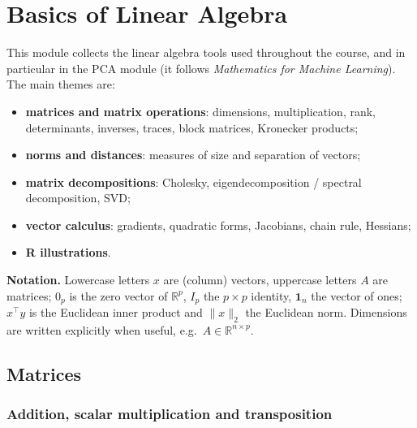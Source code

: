 
\chapter{Basics of Linear Algebra}

This module collects the linear algebra tools used throughout the course, and in particular in the
PCA module (it follows \emph{Mathematics for Machine Learning}). The main themes are:
\begin{itemize}
  \item \textbf{matrices and matrix operations}: dimensions, multiplication, rank, determinants,
        inverses, traces, block matrices, Kronecker products;
  \item \textbf{norms and distances}: measures of size and separation of vectors;
  \item \textbf{matrix decompositions}: Cholesky, eigendecomposition / spectral decomposition, SVD;
  \item \textbf{vector calculus}: gradients, quadratic forms, Jacobians, chain rule, Hessians;
  \item \textbf{R illustrations}.
\end{itemize}

\textbf{Notation.} Lowercase letters $x$ are (column) vectors, uppercase letters $A$ are matrices;
$0_p$ is the zero vector of $\mathbb{R}^p$, $I_p$ the $p \times p$ identity, $\mathbf{1}_n$ the vector of ones;
$x^\top y$ is the Euclidean inner product and $\|x\|_2$ the Euclidean norm.
Dimensions are written explicitly when useful, e.g.\ $A \in \mathbb{R}^{n \times p}$.

\section{Matrices}


\subsection{Addition, scalar multiplication and transposition}

